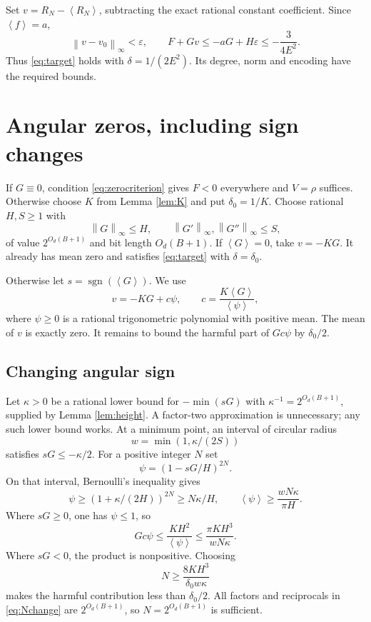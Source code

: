 \documentclass[11pt]{article}
\theoremstyle{remark}\newtheorem{remark}[theorem]{Remark}
\newcommand{\mean}[1]{\left\langle #1\right\rangle}
\newcommand{\norm}[1]{\left\|#1\right\|_\infty}
\newcommand{\se}{2^{O_d(B+1)}}
\DeclareMathOperator{\sgn}{sgn}
\begin{document}
Set \(v=R_N-\mean{R_N}\), subtracting the exact rational constant coefficient. Since \(\mean f=a\),
\[
 \norm{v-v_0}<\varepsilon,\qquad
 F+Gv\leq-aG+H\varepsilon\leq-\frac{3}{4E^2}.
\]
Thus \eqref{eq:target} holds with \(\delta=1/(2E^2)\). Its degree, norm and encoding have the required bounds.

\section{Angular zeros, including sign changes}\label{sec:zeros}

If \(G\equiv0\), condition \eqref{eq:zerocriterion} gives \(F<0\) everywhere and \(V=\rho\) suffices. Otherwise choose \(K\) from Lemma \ref{lem:K} and put \(\delta_0=1/K\). Choose rational \(H,S\geq1\) with
\[
 \norm G\leq H,\qquad \norm{G'},\norm{G''}\leq S,
\]
of value \(\se\) and bit length \(O_d(B+1)\).
If \(\mean G=0\), take \(v=-KG\). It already has mean zero and satisfies \eqref{eq:target} with \(\delta=\delta_0\).

Otherwise let \(s=\sgn(\mean G)\). We use
\begin{equation}\label{eq:vpsi}
 v=-KG+c\psi,\qquad
 c=\frac{K\mean G}{\mean\psi},
\end{equation}
where \(\psi\geq0\) is a rational trigonometric polynomial with positive mean.
The mean of \(v\) is exactly zero. It remains to bound the harmful part of \(Gc\psi\) by \(\delta_0/2\).

\subsection{Changing angular sign}

Let \(\kappa>0\) be a rational lower bound for \(-\min(sG)\) with
\(\kappa^{-1}=\se\), supplied by Lemma \ref{lem:height}. A factor-two approximation is unnecessary; any such lower bound works. At a minimum point, an interval of circular radius
\[
                           w=\min(1,\kappa/(2S))
\]
satisfies \(sG\leq-\kappa/2\).
For a positive integer \(N\) set
\[
                          \psi=(1-sG/H)^{2N}.
\]
On that interval, Bernoulli's inequality gives
\[
 \psi\geq(1+\kappa/(2H))^{2N}\geq N\kappa/H,
 \qquad
 \mean\psi\geq\frac{wN\kappa}{\pi H}.
\]
Where \(sG\geq0\), one has \(\psi\leq1\), so
\[
              Gc\psi\leq\frac{KH^2}{\mean\psi}
                       \leq\frac{\pi KH^3}{wN\kappa}.
\]
Where \(sG<0\), the product is nonpositive. Choosing
\begin{equation}\label{eq:Nchange}
                   N\geq\frac{8KH^3}{\delta_0w\kappa}
\end{equation}
makes the harmful contribution less than \(\delta_0/2\).
All factors and reciprocals in \eqref{eq:Nchange} are \(\se\), so \(N=\se\) is sufficient.
\end{document}
